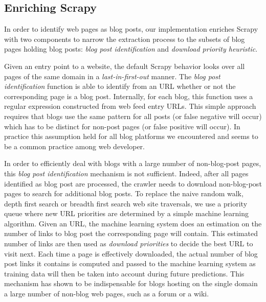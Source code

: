 \subsection{Enriching Scrapy}\label{enrichingscrapy}
In order to identify web pages as blog posts, our implementation enriches Scrapy with two components to narrow the extraction process to the subsets of blog pages holding blog posts: \emph{blog post identification} and \emph{download priority heuristic}.

Given an entry point to a website, the default Scrapy behavior looks over all pages of the same domain in a \emph{last-in-first-out} manner. The \emph{blog post identification} function is able to identify from an URL whether or not the corresponding page is a blog post. Internally, for each blog, this function uses a regular expression constructed from web feed entry URLs. This simple approach requires that blogs use the same pattern for all posts (or false negative will occur) which has to be distinct for non-post pages (or false positive will occur). In practice this assumption held for all blog platforms we encountered and seems to be a common practice among web developer.

In order to efficiently deal with blogs with a large number of non-blog-post pages, this \emph{blog post identification} mechanism is not sufficient. Indeed, after all pages identified as blog post are processed, the crawler needs to download non-blog-post pages to search for additional blog posts. To replace the naive random walk, depth first search or breadth first search web site traversals, we use a priority queue where new URL priorities are determined by a simple machine learning algorithm. Given an URL, the machine learning system does an estimation on the number of links to blog post the corresponding page will contain. This estimated number of links are then used as \emph{download priorities} to decide the best URL to visit next. Each time a page is effectively downloaded, the actual number of blog post links it contains is computed and passed to the machine learning system as training data will then be taken into account during future predictions. This mechanism has shown to be indispensable for blogs hosting on the single domain a large number of non-blog web pages, such as a forum or a wiki.


